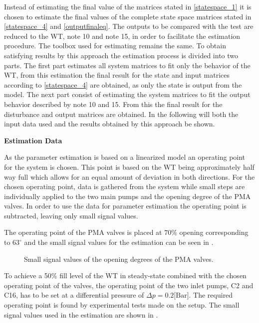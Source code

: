 Instead of estimating the final value of the matrices stated in \eqref{statespace_1} it is chosen to estimate the final values of the complete state space matrices stated in \eqref{statespace_4} and \eqref{outputfinaleq}.               
The outputs to be compared with the test are reduced to the WT, note 10 and note 15, in order to facilitate the estimation procedure. The toolbox used for estimating remains the same. 
To obtain satisfying results by this approach the estimation process is divided into two parts. 
The first part estimates all system matrices to fit only the behavior of the WT, from this estimation the final result for the state and input matrices according to \eqref{statespace_4} are obtained, as only the state is output from the model.
The next part consist of estimating the system matrices to fit the output behavior described by note 10 and 15. From this the final result for the disturbance and output matrices are obtained. 
In the following will both the input data used and the results obtained by this approach be shown.    


\textbf{Estimation Data}

As the parameter estimation is based on a linearized model an operating point for the system is chosen. This point is based on the WT being approximately half way full which allows for an equal amount of deviation in both directions. For the chosen operating point, data is gathered from the system while small steps are individually applied to the two main pumps and the opening degree of the PMA valves. In order to use the data for parameter estimation the operating point is subtracted, leaving only small signal values.  

The operating point of the PMA valves is placed at $70\%$ opening corresponding to $63^{\circ}$ and the small signal values for the estimation can be seen in .

\begin{figure}[H]
\centering
 
\caption{Small signal values of the opening degrees of the PMA valves.}
\label{fig:est_OD_data_final}
\end{figure}

To achieve a 50\% fill level of the WT in steady-state combined with the chosen operating point of the valves, the operating point of the two inlet pumps, C2 and C16, has to be set at a differential pressure of $\Delta p = 0.2 \text{[Bar]}$. The required operating point is found by experimental tests made on the setup. The small signal values used in the estimation are shown in . 

